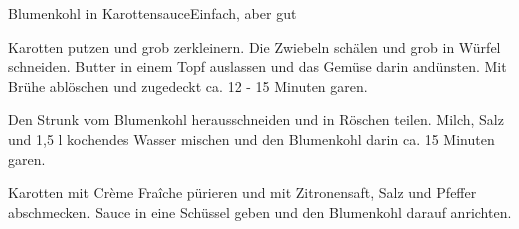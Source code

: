 \begin{recipe}{Blumenkohl in Karottensauce}{Einfach, aber gut}
  \label{Blumekohl}
  \inglist

  \steps

  Karotten putzen und grob zerkleinern. Die Zwiebeln schälen und grob in Würfel
  schneiden. Butter in einem Topf auslassen und das Gemüse darin andünsten. Mit
  Brühe ablöschen und zugedeckt ca. 12 - 15 Minuten garen.

  Den Strunk vom Blumenkohl herausschneiden und in Röschen teilen. Milch, Salz
  und 1,5 l kochendes Wasser mischen und den Blumenkohl darin ca. 15 Minuten
  garen.

  Karotten mit Crème Fraîche pürieren und mit Zitronensaft, Salz und Pfeffer
  abschmecken. Sauce in eine Schüssel geben und den Blumenkohl darauf anrichten.

\end{recipe}